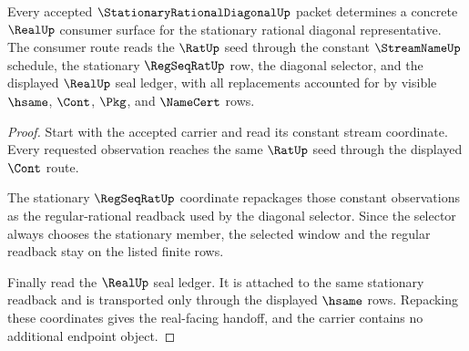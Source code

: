 \begin{theorem}
\label{thm:stationary-rational-diagonal-real-handoff}
Every accepted $\StationaryRationalDiagonalUp$ packet determines a concrete
$\RealUp$ consumer surface for the stationary rational diagonal representative.
The consumer route reads the $\RatUp$ seed through the constant
$\StreamNameUp$ schedule, the stationary $\RegSeqRatUp$ row, the diagonal
selector, and the displayed $\RealUp$ seal ledger, with all replacements
accounted for by visible $\hsame$, $\Cont$, $\Pkg$, and $\NameCert$ rows.
\end{theorem}
\begin{proof}
Start with the accepted carrier and read its constant stream coordinate. Every
requested observation reaches the same $\RatUp$ seed through the displayed
$\Cont$ route.

The stationary $\RegSeqRatUp$ coordinate repackages those constant observations
as the regular-rational readback used by the diagonal selector. Since the
selector always chooses the stationary member, the selected window and the
regular readback stay on the listed finite rows.

Finally read the $\RealUp$ seal ledger. It is attached to the same stationary
readback and is transported only through the displayed $\hsame$ rows. Repacking
these coordinates gives the real-facing handoff, and the carrier contains no
additional endpoint object.
\end{proof}

